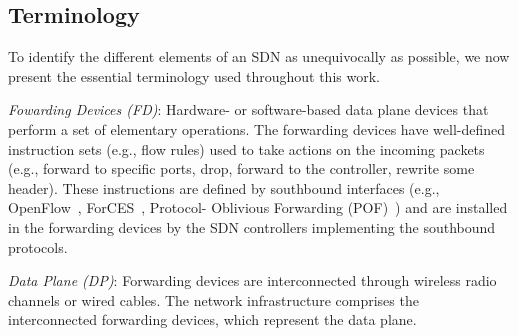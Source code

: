 %
%
%

\subsection{Terminology}

To identify the different elements of an SDN as unequivocally as possible, we now present the 
essential terminology used throughout this work.

\noindent \textit{Fowarding Devices (FD)}: Hardware- or software-based data plane devices that perform 
a set of elementary operations. The forwarding devices have well-defined instruction sets (e.g., flow 
rules) used to take actions on the incoming packets (e.g., forward to specific ports, drop, forward to 
the controller, rewrite some header). These instructions are defined by southbound interfaces (e.g., 
OpenFlow~\cite{mckeown2008}, ForCES~\cite{doria2010}, Protocol- Oblivious Forwarding (POF)~\cite{song2013}) and are installed in the forwarding devices by the SDN controllers implementing the southbound protocols.

\noindent \textit{Data Plane (DP)}: Forwarding devices are interconnected through wireless radio channels 
or wired cables. The network infrastructure comprises the interconnected forwarding devices, which 
represent the data plane.

